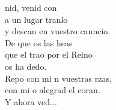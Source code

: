 \begin{cancion}%
	nid, venid con \\
	a un lugar tranlo\\
	y descan en  vuestro canncio. \\
	De que os  las heas\\
	que el trao por el Reino \\
	os ha dedo.\\
	Repo con mi n vuestras rzas,\\
	con mi o alegrad el coran. \\
\jump
	Y ahora ved...\\
\end{cancion}%
